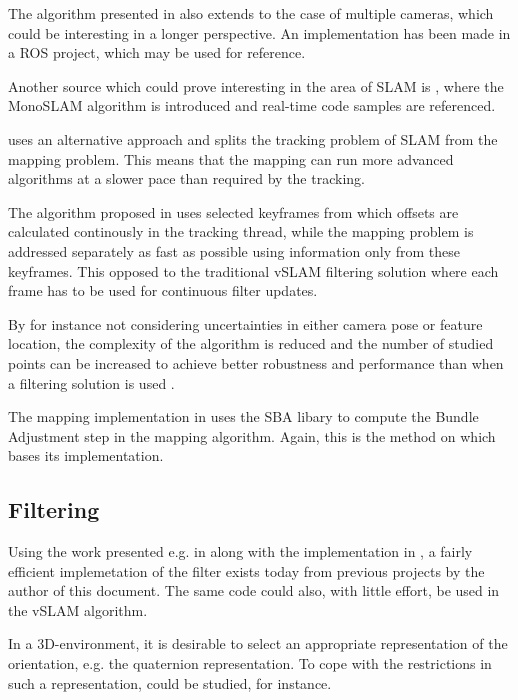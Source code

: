     The algorithm presented in \citep{Karlsson05thevslam} also extends to
    the case of multiple cameras, which could be interesting in a longer perspective.
    An implementation has been made in a ROS project\citep{rosvslam}, which may be used for
    reference.

    Another source which could prove interesting in the area of SLAM is \citep{Davison:2007:MRS:1263144.1263479}, where
    the MonoSLAM algorithm is introduced and real-time code samples are referenced.

    \citep{klein07parallel} uses an alternative approach and splits the tracking problem of SLAM from the mapping problem.
    This means that the mapping can run more advanced algorithms at a slower
    pace than required by the tracking.

    The algorithm proposed in \citep{klein07parallel} uses selected keyframes
    from which offsets are calculated continously in the tracking thread, while
    the mapping problem is addressed separately as fast as possible using information only
    from these keyframes. This opposed to the traditional vSLAM filtering
    solution where each frame has to be used for continuous filter updates.

    By for instance not considering uncertainties in either camera pose or feature location,
    the complexity of the algorithm is reduced and the number of studied points
    can be increased to achieve better robustness and performance than
    when a filtering solution is used \citep{DBLP:conf/icra/StrasdatMD10}.

    The mapping implementation in \citep{DBLP:conf/icra/StrasdatMD10} uses the SBA libary \citep{sba,lour09}
    to compute the Bundle Adjustment step in the mapping algorithm.
    Again, this is the method on which \citep{weiss11monocular} bases its implementation.


    \subsection{Filtering}
    Using the work presented e.g. in \citep{Julier95anewapproach,Julier97anew,vandermerwe:upf}
    along with the implementation in \citep{bayesclasses}, a fairly
    efficient implemetation of the filter exists today from previous projects by
    the author of this document.
    The same code could also, with little effort, be used in the vSLAM algorithm.

    In a 3D-environment, it is desirable to select an appropriate representation
    of the orientation, e.g. the quaternion representation.
    To cope with the restrictions in such a representation, \citep{DBLP:journals/ras/Ude99}
    could be studied, for instance.
